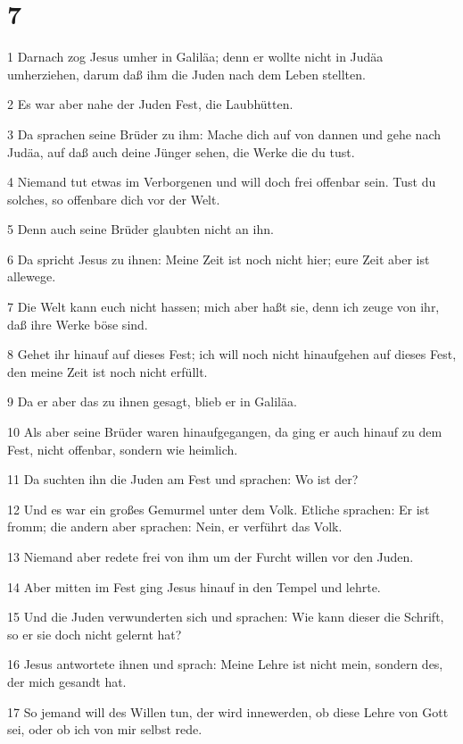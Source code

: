\chapter{7}

\par 1 Darnach zog Jesus umher in Galiläa; denn er wollte nicht in Judäa umherziehen, darum daß ihm die Juden nach dem Leben stellten.
\par 2 Es war aber nahe der Juden Fest, die Laubhütten.
\par 3 Da sprachen seine Brüder zu ihm: Mache dich auf von dannen und gehe nach Judäa, auf daß auch deine Jünger sehen, die Werke die du tust.
\par 4 Niemand tut etwas im Verborgenen und will doch frei offenbar sein. Tust du solches, so offenbare dich vor der Welt.
\par 5 Denn auch seine Brüder glaubten nicht an ihn.
\par 6 Da spricht Jesus zu ihnen: Meine Zeit ist noch nicht hier; eure Zeit aber ist allewege.
\par 7 Die Welt kann euch nicht hassen; mich aber haßt sie, denn ich zeuge von ihr, daß ihre Werke böse sind.
\par 8 Gehet ihr hinauf auf dieses Fest; ich will noch nicht hinaufgehen auf dieses Fest, den meine Zeit ist noch nicht erfüllt.
\par 9 Da er aber das zu ihnen gesagt, blieb er in Galiläa.
\par 10 Als aber seine Brüder waren hinaufgegangen, da ging er auch hinauf zu dem Fest, nicht offenbar, sondern wie heimlich.
\par 11 Da suchten ihn die Juden am Fest und sprachen: Wo ist der?
\par 12 Und es war ein großes Gemurmel unter dem Volk. Etliche sprachen: Er ist fromm; die andern aber sprachen: Nein, er verführt das Volk.
\par 13 Niemand aber redete frei von ihm um der Furcht willen vor den Juden.
\par 14 Aber mitten im Fest ging Jesus hinauf in den Tempel und lehrte.
\par 15 Und die Juden verwunderten sich und sprachen: Wie kann dieser die Schrift, so er sie doch nicht gelernt hat?
\par 16 Jesus antwortete ihnen und sprach: Meine Lehre ist nicht mein, sondern des, der mich gesandt hat.
\par 17 So jemand will des Willen tun, der wird innewerden, ob diese Lehre von Gott sei, oder ob ich von mir selbst rede.
